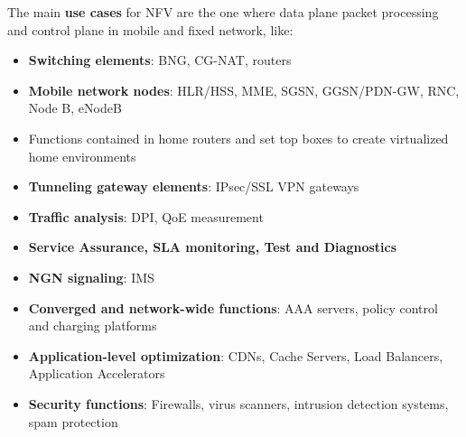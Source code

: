 \documentclass[10pt,a4paper]{report}
\theoremstyle{definition}
\begin{document}
The main \textbf{use cases} for NFV are the one where data plane packet processing and control plane in mobile and fixed network, like:
\begin{itemize}
	\item 
	\textbf{Switching elements}: BNG, CG-NAT, routers
	\item 
	\textbf{Mobile network nodes}: HLR/HSS, MME, SGSN, GGSN/PDN-GW, RNC, Node B, eNodeB
	\item 
	Functions contained in home routers and set top boxes to create virtualized home environments
	\item 
	\textbf{Tunneling gateway elements}: IPsec/SSL VPN gateways
	\item 
	\textbf{Traffic analysis}: DPI, QoE measurement
	\item 
	\textbf{Service Assurance, SLA monitoring, Test and Diagnostics}
	\item 
	\textbf{NGN signaling}: IMS
	\item 
	\textbf{Converged and network-wide functions}: AAA servers, policy control and charging platforms
	\item 
	\textbf{Application-level optimization}: CDNs, Cache Servers, Load Balancers, Application Accelerators
	\item 
	\textbf{Security functions}: Firewalls, virus scanners, intrusion detection systems, spam protection
\end{itemize}
\end{document}
